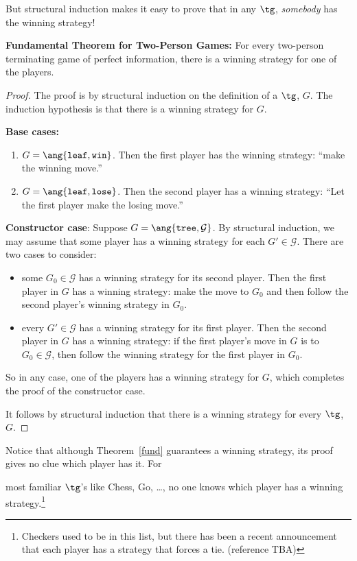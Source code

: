 \begin{definition}
But structural induction makes it easy to prove that in any $\tg$,
\emph{somebody} has the winning strategy!

\begin{theorem}\label{fund}
\textbf{Fundamental Theorem for Two-Person Games:} For every two-person
terminating game of perfect information, there is a winning strategy for
one of the players.
\end{theorem}

\begin{proof}
The proof is by structural induction on the definition of a $\tg$, $G$.
The induction hypothesis is that there is a winning strategy for $G$.

\textbf{Base cases:}
\begin{enumerate}

\item $G=\ang{\texttt{leaf}, \texttt{win}}$.  Then the first player has the
 winning strategy: ``make the winning move.''

\item $G=\ang{\texttt{leaf}, \texttt{lose}}$.  Then the second player has a
 winning strategy: ``Let the first player make the losing move.''
\end{enumerate}

\textbf{Constructor case}: Suppose $G = \ang{\texttt{tree},\mathcal{G}}$.
By structural induction, we may assume that some player has a winning
strategy for each $G' \in \mathcal{G}$.  There are two cases to consider:
\begin{itemize}
\item some $G_0 \in \mathcal{G}$ has a winning strategy for its second
  player.  Then the first player in $G$ has a winning strategy: make the
  move to $G_0$ and then follow the second player's winning strategy in
  $G_0$.

\item every $G' \in \mathcal{G}$ has a winning strategy for its first
  player.  Then the second player in $G$ has a winning strategy: if the
  first player's move in $G$ is to $G_0 \in \mathcal{G}$, then follow the
  winning strategy for the first player in $G_0$.
\end{itemize}
So in any case, one of the players has a winning strategy for $G$, which
completes the proof of the constructor case.

It follows by structural induction that there is a winning strategy for
every $\tg$, $G$.
\end{proof}

Notice that although Theorem~\ref{fund} guarantees a winning strategy, its
proof gives no clue which player has it.  For

most familiar $\tg$'s like Chess, Go, \dots, no one knows
which player has a winning strategy.\footnote{Checkers used to be in this
  list, but there has been a recent announcement that each player has a
  strategy that forces a tie. (reference TBA)}


\end{definition}
